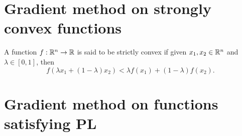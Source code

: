 \documentclass[10pt,a4paper]{article}
\begin{document}
\section{Gradient method on strongly convex functions}

\begin{definition}
	A function $f:\mathbb{R}^n\to \mathbb{R}$ is said to be strictly convex if given $x_1,x_2\in \mathbb{R}^n$ and $\lambda\in [0,1]$, then 
	\begin{equation*}
		f(\lambda x_1 +(1-\lambda) x_2) < \lambda f(x_1) +(1-\lambda) f(x_2).
	\end{equation*}
\end{definition}


\section{Gradient method on functions satisfying PL}
\end{document}
